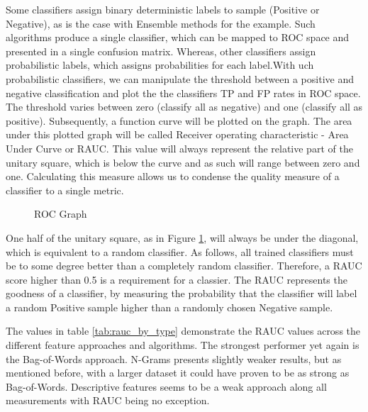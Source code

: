 		\par
		
		Some classifiers assign binary deterministic labels to sample (Positive or Negative), as is the case with Ensemble methods for the example. Such algorithms produce a single classifier, which can be mapped to ROC space and presented in a single confusion matrix. Whereas, other classifiers assign probabilistic labels, which assigns probabilities for each label.With uch probabilistic classifiers, we can manipulate the threshold between a positive and negative classification and plot the the classifiers TP and FP rates in ROC space. The threshold varies between zero (classify all as negative) and one (classify all as positive). Subsequently, a function curve will be plotted on the graph. The area under this plotted graph will be called Receiver operating characteristic - Area Under Curve or RAUC. This value will always represent the relative part of the unitary square, which is below the curve and as such will range between zero and one. Calculating this measure allows us to condense the quality measure of a classifier to a single metric.
		
		\begin{figure}[H]
			\centering
			\footnotesize
			\scalebox{.8}{}
			\captionsetup{width=0.8\textwidth}
			\caption{ROC Graph}
			\label{fig:roc}
		\end{figure}
		
		\par
		
		One half of the unitary square, as in Figure \ref{fig:roc}, will always be under the diagonal, which is equivalent to a random classifier. As follows, all trained classifiers must be to some degree better than a completely random classifier. Therefore, a RAUC score higher than 0.5 is a requirement for a classier. The RAUC represents the goodness of a classifier, by measuring the probability that the classifier will label a random Positive sample higher than a randomly chosen Negative sample. 
		
		\par
		
		The values in table \ref{tab:rauc_by_type} demonstrate the RAUC values across the different feature approaches and algorithms. The strongest performer yet again is the Bag-of-Words approach. N-Grams presents slightly weaker results, but as mentioned before, with a larger dataset it could have proven to be as strong as Bag-of-Words. Descriptive features seems to be a weak approach along all measurements with RAUC being no exception.
		
